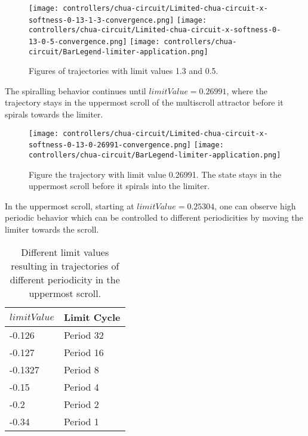 \documentclass[main]{subfiles}
\begin{document}
\begin{figure}[H]
\centering
\texttt{[image: controllers/chua-circuit/Limited-chua-circuit-x-softness-0-13-1-3-convergence.png]}
\texttt{[image: controllers/chua-circuit/Limited-chua-circuit-x-softness-0-13-0-5-convergence.png]}
\texttt{[image: controllers/chua-circuit/BarLegend-limiter-application.png]}
\caption[Figure of period 1 limit cycle using a 0.13 soft limiter.]{Figures of trajectories with limit values 1.3 and 0.5.}
\label{figure:x-0.13-spiral-trajectories}
\end{figure}

The spiralling behavior continues until \(limitValue=0.26991\), where the trajectory stays in the uppermost scroll of the multiscroll attractor before it spirals towards the limiter.

\begin{figure}[H]
\centering
\texttt{[image: controllers/chua-circuit/Limited-chua-circuit-x-softness-0-13-0-26991-convergence.png]}
\texttt{[image: controllers/chua-circuit/BarLegend-limiter-application.png]}
\caption[Figure of trajectory with limit value 0.26991.]{Figure the trajectory with limit value 0.26991. The state stays in the uppermost scroll before it spirals into the limiter.}
\label{figure:x-0.13-upper-scroll-trajectory}
\end{figure}

In the uppermost scroll, starting at \(limitValue=0.25304\), one can observe high periodic behavior which can be controlled to different periodicities by moving the limiter towards the scroll. 

\begin{table}[H]
\renewcommand{\arraystretch}{1.2}
\center
\begin{tabular}{@{}ll@{}}
	\toprule
   \(limitValue\) & Limit Cycle\\
   \midrule
   -0.126 & Period 32 \\
   -0.127 & Period 16 \\
   -0.1327 & Period 8 \\ 
   -0.15 & Period 4 \\
   -0.2  & Period 2 \\
   -0.34 & Period 1 \\
   \bottomrule
\end{tabular}
\caption[Limiter values for periodic trajectories for an x self-limiting limiter with softness 0.13]{Different limit values resulting in trajectories of different periodicity in the uppermost scroll.}
\label{table:x-0.13-periodicities}
\end{table}
\end{document}
